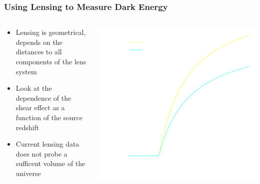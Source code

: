\documentclass{beamer}
\begin{document}
\frame
{
    \frametitle{Using Lensing to Measure Dark Energy}

    \begin{columns}
        \begin{column}{0.5\textwidth}    
            \begin{itemize}

                \item Lensing is geometrical, depends on the distances to all
                    components of the lens system

                \item Look at the dependence of the shear effect as a function
                    of the source redshift
                    
                \item Current lensing data does not probe a sufficent volume of
                    the universe

            \end{itemize}
        \end{column}
        \begin{column}{0.5\textwidth}
            \begin{center}
                \includegraphics[width=\textwidth]{scinv-example-invert.pdf}
            \end{center}
        \end{column}
    \end{columns}
}
\end{document}
